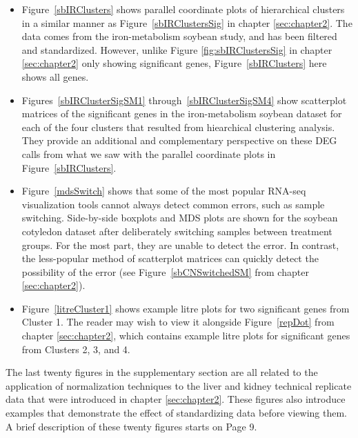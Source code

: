 \documentclass[11pt,a4paper,oldfontcommands,openany]{memoir}
\numberwithin{equation}{section} %
\begin{document}
\begin{itemize}

\item Figure~\ref{sbIRClusters} shows parallel coordinate plots of hierarchical clusters in a similar manner as Figure~\ref{sbIRClustersSig} in chapter \ref{sec:chapter2}. The data comes from the iron-metabolism soybean study, and has been filtered and standardized. However, unlike Figure \ref{fig:sbIRClustersSig} in chapter \ref{sec:chapter2} only showing significant genes, Figure~\ref{sbIRClusters} here shows all genes.

\item Figures~\ref{sbIRClusterSigSM1} through~\ref{sbIRClusterSigSM4} show scatterplot matrices of the significant genes in the iron-metabolism soybean dataset for each of the four clusters that resulted from hiearchical clustering analysis. They provide an additional and complementary perspective on these DEG calls from what we saw with the parallel coordinate plots in Figure~\ref{sbIRClusters}. 

\item Figure~\ref{mdsSwitch} shows that some of the most popular RNA-seq visualization tools cannot always detect common errors, such as sample switching. Side-by-side boxplots and MDS plots are shown for the soybean cotyledon dataset after deliberately switching samples between treatment groups. For the most part, they are unable to detect the error. In contrast, the less-popular method of scatterplot matrices can quickly detect the possibility of the error (see Figure~\ref{sbCNSwitchedSM} from chapter \ref{sec:chapter2}).

\item Figure~\ref{litreCluster1} shows example litre plots for two significant genes from Cluster 1. The reader may wish to view it alongside Figure~\ref{repDot} from chapter \ref{sec:chapter2}, which contains example litre plots for significant genes from Clusters 2, 3, and 4.

\end{itemize}

The last twenty figures in the supplementary section are all related to the application of normalization techniques to the liver and kidney technical replicate data that were introduced in chapter \ref{sec:chapter2}. These figures also introduce examples that demonstrate the effect of standardizing data before viewing them. A brief description of these twenty figures starts on Page 9.
\end{document}
